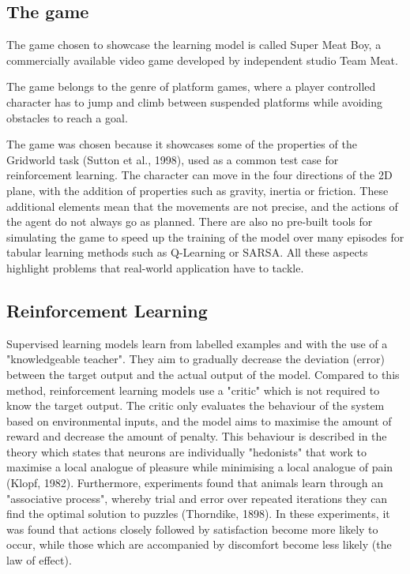 \documentclass[10pt]{article}
\begin{document}
    \setcounter{figure}{3}

    \subsection{The game}

    The game chosen to showcase the learning model is called Super Meat Boy, a commercially available video game developed by independent studio Team Meat.
    
    The game belongs to the genre of platform games, where a player controlled character has to jump and climb between suspended platforms while avoiding obstacles to reach a goal.

    The game was chosen because it showcases some of the properties of the Gridworld task (Sutton et al., 1998), used as a common test case for reinforcement learning. The character can move in the four directions of the 2D plane, with the addition of properties such as gravity, inertia or friction. These additional elements mean that the movements are not precise, and the actions of the agent do not always go as planned. There are also no pre-built tools for simulating the game to speed up the training of the model over many episodes for tabular learning methods such as Q-Learning or SARSA. All these aspects highlight problems that real-world application have to tackle.

    \subsection{Reinforcement Learning}

    Supervised learning models learn from labelled examples and with the use of a "knowledgeable teacher". They aim to gradually decrease the deviation (error) between the target output and the actual output of the model. Compared to this method, reinforcement learning models use a "critic" which is not required to know the target output. The critic only evaluates the behaviour of the system based on environmental inputs, and the model aims to maximise the amount of reward and decrease the amount of penalty. This behaviour is described in the theory which states that neurons are individually "hedonists" that work to maximise a local analogue of pleasure while minimising a local analogue of pain (Klopf, 1982). Furthermore, experiments found that animals learn through an "associative process", whereby trial and error over repeated iterations they can find the optimal solution to puzzles (Thorndike, 1898). In these experiments, it was found that actions closely followed by satisfaction become more likely to occur, while those which are accompanied by discomfort become less likely (the law of effect).
\end{document}
